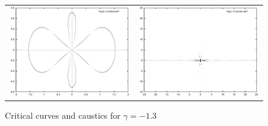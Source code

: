\documentclass[aspectratio=1610,xcolor=dvipsnames,t]{beamer}
\begin{document}
    \begin{figure}
        \caption{Critical curves and caustics for $\gamma = -1.3$}
        \label{fig:critical-gamma-1-3} 
        \begin{center}
            \begin{tabular}{cc}
                \includegraphics[width=\columnwidth]{images/neg1-3-critical.eps}  &
                \includegraphics[width=\columnwidth]{images/neg1-3-caustic.eps} 
            \end{tabular} 
        \end{center}
    \end{figure}
\end{document}
